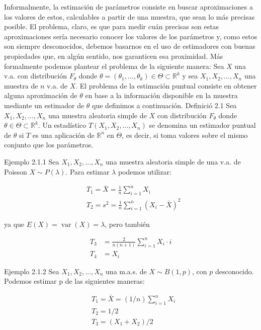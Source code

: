 \documentclass[
]{article}
\begin{document}
Informalmente, la estimación de parámetros consiste en buscar aproximaciones a los valores de estos, calculables a partir de una muestra, que sean lo más precisas posible. El problema, claro, es que para medir cuán precisas son estas aproximaciones sería necesario conocer los valores de los parámetros y, como estos son siempre desconocidos, debemos basarnos en el uso de estimadores con buenas propiedades que, en algún sentido, nos garanticen esa proximidad.
Más formalmente podemos plantear el problema de la siguiente manera:
Sea \(X\) una v.a. con distribución \(F_{\theta}\) donde \(\theta=\left(\theta_{1}, \ldots, \theta_{k}\right) \in \Theta \subset \mathbb{R}^{k}\) y sea \(X_{1}, X_{2}, \ldots, X_{n}\) una muestra de \(n\) v.a. de \(X\). El problema de la estimación puntual consiste en obtener alguna aproximación de \(\theta\) en base a la información disponible en la muestra mediante un estimador de \(\theta\) que definimos a continuación.
Definició 2.1 Sea \(X_{1}, X_{2}, \ldots, X_{n}\) una muestra aleatoria simple de \(X\) con distribución \(F_{\theta}\) donde \(\theta \in \Theta \subset \mathbb{R}^{k}\). Un estadístico \(T\left(X_{1}, X_{2}, \ldots, X_{n}\right)\) se denomina un estimador puntual de \(\theta\) si \(T\) es una aplicación de \(\mathbb{R}^{n}\) en \(\Theta\), es decir, si toma valores sobre el mismo conjunto que los parámetros.

Ejemplo 2.1.1 Sea \(X_{1}, X_{2}, \ldots, X_{n}\) una muestra aleatoria simple de una v.a. de Poisson \(X \sim P(\lambda)\). Para estimar \(\lambda\) podemos utilizar:

\[
\begin{aligned}
& T_{1}=\bar{X}=\frac{1}{n} \sum_{i=1}^{n} X_{i} \\
& T_{2}=s^{2}=\frac{1}{n} \sum_{i=1}^{n}\left(X_{i}-\bar{X}\right)^{2}
\end{aligned}
\]

ya que \(E(X)=\operatorname{var}(X)=\lambda\), pero también

\[
\begin{aligned}
T_{3} & =\frac{2}{n(n+1)} \sum_{i=1}^{n} X_{i} \cdot i \\
T_{4} & =X_{i}
\end{aligned}
\]

Ejemplo 2.1.2 Sea \(X_{1}, X_{2}, \ldots, X_{n}\) una m.a.s. de \(X \sim B(1, p)\), con \(p\) desconocido. Podemos estimar p de las siguientes maneras:

\[
\begin{aligned}
& T_{1}=\bar{X}=(1 / n) \sum_{i=1}^{n} X_{i} \\
& T_{2}=1 / 2 \\
& T_{3}=\left(X_{1}+X_{2}\right) / 2
\end{aligned}
\]
\end{document}
